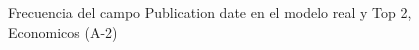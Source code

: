 \begin{figure}[H]
    \centering
    
    \caption{Frecuencia del campo Publication date en el modelo real y Top 2, Economicos (A-2)}
    \label{frecuency-Publication Date-top2}
\end{figure}